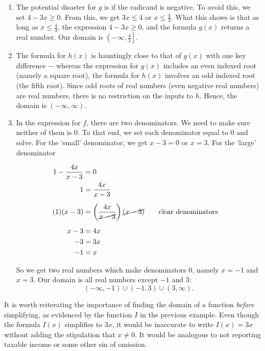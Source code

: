 {
\begin{enumerate}


\item  The potential disaster for $g$ is if the radicand is negative.  To avoid this, we set $4 - 3x \geq 0$. From this, we get $3x \leq 4$ or $x \leq \frac{4}{3}$.  What this shows is that as long as $x \leq \frac{4}{3}$, the expression $4 - 3x \geq 0$, and the formula $g(x)$ returns a real number.  Our domain is $\left(-\infty, \frac{4}{3}\right]$.

\item  The formula for $h(x)$ is hauntingly close to that of $g(x)$ with one key difference $-$ whereas the expression for $g(x)$ includes an even indexed root (namely a square root), the formula for $h(x)$ involves an odd indexed root (the fifth root).  Since odd roots of real numbers (even negative real numbers) are real numbers, there is no restriction on the inputs to $h$.  Hence, the domain is $(-\infty, \infty)$.


\item  In the expression for $f$, there are two denominators.  We need to make sure neither of them is $0$.  To that end, we set each denominator equal to $0$ and solve.  For the `small' denominator, we get $x - 3 = 0$ or $x=3$.  For the `large' denominator

\begin{align*}
1 - \dfrac{4x}{x-3} & =  0  & \\
                  1 & =  \dfrac{4x}{x-3}  \\[5pt] 
           (1)(x-3) & =  \left(\dfrac{4x}{\cancel{x-3}}\right)\cancel{(x-3)}  \tag*{clear denominators}  \\[5pt]
              x - 3 & =   4x \\
                 -3 & =  3x \\
                 -1 & =  x 
\end{align*}

So we get two real numbers which make denominators $0$, namely $x = -1$ and $x=3$.  Our domain is all real numbers except $-1$ and $3$:  
\[
(-\infty, -1) \cup (-1,3) \cup (3, \infty).
\]

\end{enumerate}
}

\medskip

It is worth reiterating the importance of finding the domain of a function \emph{before} simplifying, as evidenced by the function $I$ in the previous example.  Even though the formula $I(x)$ simplifies to $3x$, it would be inaccurate to write $I(x) = 3x$ without adding the stipulation that $x \neq 0$. It would be analogous to not reporting taxable income or some other sin of omission.




